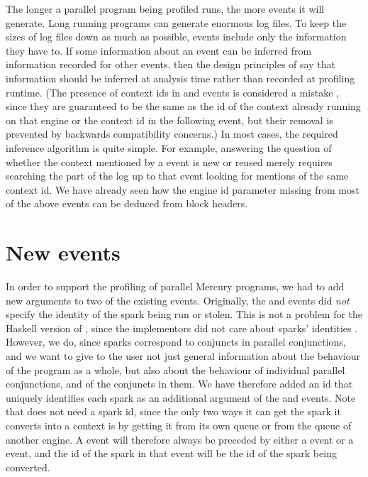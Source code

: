 The longer a parallel program being profiled runs,
the more events it will generate.
Long running programs can generate enormous log files.
To keep the sizes of log files down as much as possible,
events include only the information they have to.
If some information about an event
can be inferred from information recorded for other events,
then the design principles of \tscope say
that information should be inferred at analysis time
rather than recorded at profiling runtime.
(The presence of context ids in  and 
events is considered a mistake \citep{threadscope-summit},
since they are guaranteed to be the same as the id of the context already
running on that engine or
the context id in the following  event,
but their removal is prevented by backwards compatibility concerns.)
In most cases, the required inference algorithm is quite simple.
For example, answering the question of whether the context
mentioned by a  event is new or reused
merely requires searching the part of the log up to that event
looking for mentions of the same context id.
We have already seen how the engine id parameter
missing from most of the above events
can be deduced from block headers.

\section{New events}
\label{sec:tscope_newevents}

In order to support the profiling of parallel Mercury programs,
we had to add new arguments to two of the existing \tscope events.
Originally, the  and  events
did \emph{not} specify the identity of the spark being run or stolen.
This is not a problem for the Haskell version of \tscope,
since the implementors did not care about sparks' identities
\citep{threadscope-summit}.
However, we do, since sparks correspond to conjuncts in parallel conjunctions,
and we want to give to the user not just general information
about the behaviour of the program as a whole,
but also about the behaviour of individual parallel conjunctions,
and of the conjuncts in them.
We have therefore added an id that uniquely identifies each spark
as an additional argument of the  and 
events.
Note that  does not need a spark id,
since the only two ways it can get the spark it converts into a context
is by getting it from its own queue or from the queue of another engine.
A  event will therefore always be preceded
by either a  event or a  event,
and the id of the spark in that event
will be the id of the spark being converted.

